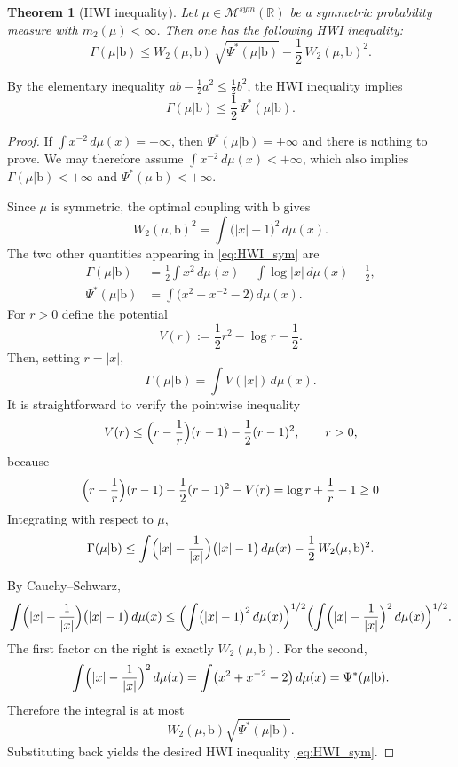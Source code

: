 \documentclass[10pt, reqno]{amsart}
\numberwithin{equation}{section}
\theoremstyle{definition}
\theoremstyle{plain}
\newtheorem{theorem}[definition]{Theorem}
\theoremstyle{remark}
\newcommand{\R}{\mathbb{R}}
\newcommand{\1}{\mathbbm{1}}
\begin{document}
\begin{theorem}[HWI inequality]\label{thm:HWI_sym}
Let $\mu\in\mathcal{M}^{sym}(\R)$ be a symmetric probability measure with $m_2(\mu)<\infty$.
Then one has the following HWI inequality:
\begin{equation}\label{eq:HWI_sym}
\Gamma(\mu|\mathbb{\mathrm{b}})
\leq
W_2(\mu,\mathbb{\mathrm{b}})\,\sqrt{\Psi^*(\mu|\mathbb{\mathrm{b}})}
-\frac12\,W_2(\mu,\mathbb{\mathrm{b}})^2.
\end{equation}
\end{theorem}
\label{rem:HWI_implies_LSI_star}
By the elementary inequality $ab-\frac12a^2\le \frac12 b^2$, the HWI inequality implies
\[
\Gamma(\mu|\mathbb{\mathrm{b}})\le \frac12\,\Psi^*(\mu|\mathbb{\mathrm{b}}).
\]
\begin{proof}
If $\int x^{-2}\,d\mu(x)=+\infty$, then $\Psi^*(\mu|\mathbb{\mathrm{b}})=+\infty$ and there is nothing to prove. We may therefore assume $\int x^{-2}\,d\mu(x)<+\infty$, which also implies $\Gamma(\mu|\mathbb{\mathrm{b}})<+\infty$ and $\Psi^*(\mu|\mathbb{\mathrm{b}})<+\infty$.

Since $\mu$ is symmetric, the optimal coupling with $\mathbb{\mathrm{b}}$ gives
\[
W_2(\mu,\mathbb{\mathrm{b}})^2=\int\bigl(|x|-1\bigr)^2\,d\mu(x).
\]
The two other quantities appearing in \eqref{eq:HWI_sym} are
\begin{align*}
\Gamma(\mu|\mathbb{\mathrm{b}})
&=\frac12\int x^2\,d\mu(x)-\int\log|x|\,d\mu(x)-\frac12,\\
\Psi^*(\mu|\mathbb{\mathrm{b}})
&=\int\bigl(x^2+x^{-2}-2\bigr)\,d\mu(x).
\end{align*}
For $r>0$ define the potential
\[
V(r):=\frac12 r^2-\log r-\frac12.
\]
Then, setting $r=|x|$,
\[
\Gamma(\mu|\mathbb{\mathrm{b}})=\int V(|x|)\,d\mu(x).
\]
It is straightforward to verify the pointwise inequality
\[
V(r)\le \Bigl(r-\frac1r\Bigr)(r-1)-\frac12(r-1)^2,\qquad r>0,
\]
because
\[
\Bigl(r-\frac1r\Bigr)(r-1)-\frac12(r-1)^2 - V(r) = \log r + \frac1r -1 \ge 0
\]
Integrating with respect to $\mu$,
\[
\Gamma(\mu|\mathbb{\mathrm{b}})
\le
\int\Bigl(|x|-\frac1{|x|}\Bigr)\bigl(|x|-1\bigr)\,d\mu(x)
-\frac12\,W_2(\mu,\mathbb{\mathrm{b}})^2.
\]

By Cauchy--Schwarz,
\[
\int\Bigl(|x|-\frac1{|x|}\Bigr)\bigl(|x|-1\bigr)\,d\mu(x)
\le
\Bigl(\int\bigl(|x|-1\bigr)^2\,d\mu(x)\Bigr)^{1/2}
\Bigl(\int\Bigl(|x|-\frac1{|x|}\Bigr)^2\,d\mu(x)\Bigr)^{1/2}.
\]
The first factor on the right is exactly $W_2(\mu,\mathbb{\mathrm{b}})$. For the second,
\[
\int\Bigl(|x|-\frac1{|x|}\Bigr)^2\,d\mu(x)
=\int\bigl(x^2+x^{-2}-2\bigr)\,d\mu(x)=\Psi^*(\mu|\mathbb{\mathrm{b}}).
\]
Therefore the integral is at most
\[
W_2(\mu,\mathbb{\mathrm{b}})\sqrt{\Psi^*(\mu|\mathbb{\mathrm{b}})}.
\]Substituting back yields the desired HWI inequality \eqref{eq:HWI_sym}.
\end{proof}
\end{document}

